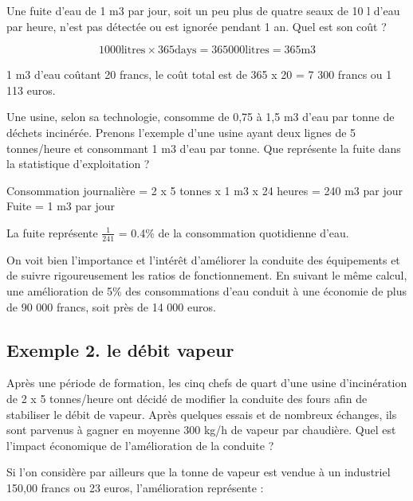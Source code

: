 Une fuite d’eau de 1 m3 par jour, soit un peu plus de quatre seaux de 10 l d’eau par heure, n’est pas détectée ou est ignorée pendant 1 an. Quel est son coût ? 


\[
1 000 \text{litres} \times 365 \text{days} = 365 000 \text{litres} = 365 \text{m3}
\]



1 m3 d’eau coûtant 20 francs,
le coût total est de 365 x 20 = 7 300 francs ou 1 113 euros.
\vspace{0.3cm}

Une usine, selon sa technologie, consomme de 0,75 à 1,5 m3 d’eau par tonne de déchets incinérée. Prenons l’exemple d’une usine ayant deux lignes de 5 tonnes/heure et consommant 1 m3 d’eau par tonne. Que représente la fuite dans la statistique d’exploitation ?
\vspace{0.3cm}

Consommation journalière = 2 x 5 tonnes x 1 m3 x 24 heures = 240 m3 par jour
Fuite = 1 m3 par jour

\vspace{0.3cm}

La fuite représente $ \frac{1}{241}$ = 0.4\% de la consommation quotidienne d'eau.
\vspace{0.3cm}


On voit bien l’importance et l’intérêt d’améliorer la conduite des équipements et de suivre rigoureusement les ratios de fonctionnement. En suivant le même calcul, une amélioration de 5\% des consommations d’eau conduit à une économie de plus de 90 000 francs, soit près de 14 000 euros.


\subsection{	Exemple 2. le débit vapeur}

Après une période de formation, les cinq chefs de quart d’une usine d’incinération de 2 x 5 tonnes/heure ont décidé de modifier la conduite des fours afin de stabiliser le débit de vapeur. Après quelques essais et de nombreux échanges, ils sont parvenus à gagner en moyenne 300 kg/h de vapeur par chaudière. Quel est l’impact économique de l’amélioration de la conduite ?
\vspace{0.3cm}

Si l’on considère par ailleurs que la tonne de vapeur est vendue à un industriel 150,00 francs ou 23 euros, l’amélioration représente :

\vspace{0.3cm}

